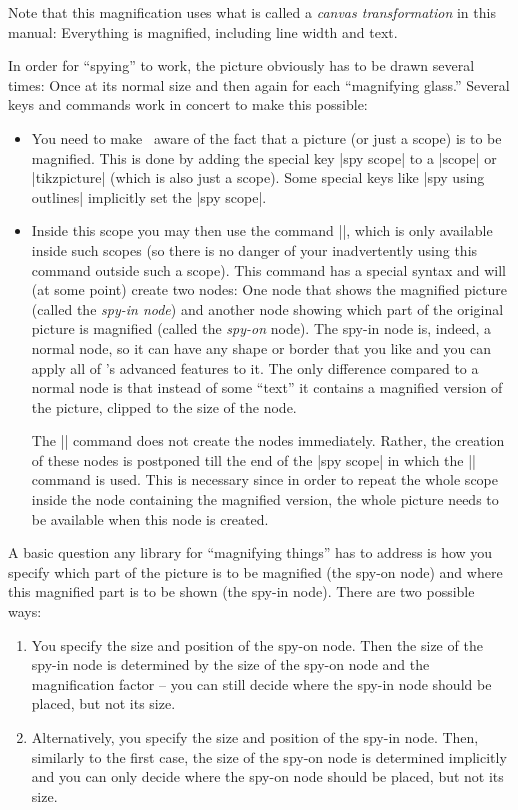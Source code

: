 Note that this magnification uses what is called a \emph{canvas
  transformation} in this manual: Everything is magnified, including
line width and text.

In order for ``spying'' to work, the picture obviously has to be drawn
several times: Once at its normal size and then again for each
``magnifying glass.'' Several keys and commands work in concert to
make this possible:
\begin{itemize}
\item You need to make \tikzname\ aware of the fact that a picture (or
  just a scope) is to be magnified. This is done by adding the special
  key |spy scope| to a |{scope}| or |{tikzpicture}| (which is also
  just a scope). Some special keys like |spy using outlines|
  implicitly set the |spy scope|.

\item Inside this scope you may then use the command |\spy|, which is
  only available inside such scopes (so there is no danger of your
  inadvertently using this command outside such a scope). This command
  has a special syntax and will (at some point) create two nodes: One
  node that shows the magnified picture (called the \emph{spy-in
    node}) and another node showing which part of the original picture
  is magnified (called the \emph{spy-on} node). The spy-in node is,
  indeed, a normal node, so it can have any shape or border that you
  like and you can apply all of \tikzname's advanced features to
  it. The only difference compared to a normal node is that instead of
  some ``text'' it contains a magnified version of the picture,
  clipped to the size of the node. 

  The |\spy| command does not create the nodes immediately. Rather,
  the creation of these nodes is postponed till the end of the
  |spy scope| in which the |\spy| command is used. This is necessary
  since in order to repeat the whole scope inside the node containing
  the magnified version, the whole picture needs to be available when
  this node is created.
\end{itemize}

A basic question any library for ``magnifying things'' has to address
is how you specify which part of the picture is to be
magnified (the spy-on node) and where this magnified part is to be
shown (the spy-in node). There are two possible ways:
\begin{enumerate}
\item You specify the size and position of the spy-on node. Then the
  size of the spy-in node is determined by the size of the spy-on node
  and the magnification factor -- you can still decide where the
  spy-in node should be placed, but not its size.
\item Alternatively, you specify the size and position of the spy-in
  node. Then, similarly to the first case, the size of the spy-on node
  is determined implicitly and you can only decide where the
  spy-on node should be placed, but not its size.
\end{enumerate}

